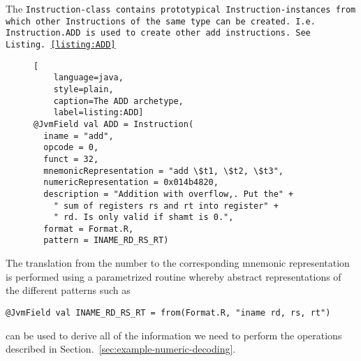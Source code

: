 The \tt{Instruction}-class contains prototypical
\tt{Instruction}-instances from which other \tt{Instruction}s of the
same type can be created. I.e. \tt{Instruction.ADD} is used to create
other \tt{add} instructions. See Listing.~\ref{listing:ADD}

\begin{figure}
\begin{lstlisting}[
    language=java,
    style=plain,
    caption=The ADD archetype,
    label=listing:ADD]
@JvmField val ADD = Instruction(
  iname = "add",
  opcode = 0,
  funct = 32,
  mnemonicRepresentation = "add \$t1, \$t2, \$t3",
  numericRepresentation = 0x014b4820,
  description = "Addition with overflow,. Put the" +
    " sum of registers rs and rt into register" +
    " rd. Is only valid if shamt is 0.",
  format = Format.R,
  pattern = INAME_RD_RS_RT)
\end{lstlisting}
\end{figure}

The translation from the number to the corresponding mnemonic
representation is performed using a parametrized routine whereby
abstract representations of the different patterns such as

\begin{lstlisting}[style=plain]
@JvmField val INAME_RD_RS_RT = from(Format.R, "iname rd, rs, rt")
\end{lstlisting}

can be used to derive all of the information we need to perform
the operations described in Section.~\ref{sec:example-numeric-decoding}.

